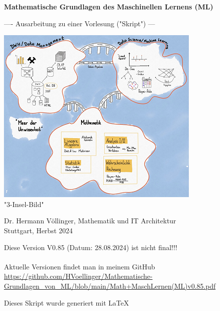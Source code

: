 \documentclass[12pt]{article}
\begin{document}

\begin{titlepage}
   \begin{center}
   \LARGE  
   \vspace{1.0cm}
       
   \textbf{Mathematische Grundlagen des Maschinellen Lernens (ML)}

   \vspace{1.0cm}
  
   \large       
   ---- Ausarbeitung zu einer Vorlesung ("Skript") ---
       
   
   \vspace{1.0cm}
   
   \includegraphics{DWH-Zeichnung}\\
   \small "3-Insel-Bild"  
       
   \vfill
   \large   
   
   Dr. Hermann Völlinger, Mathematik und IT Architektur
           \\ Stuttgart, Herbst 2024     

   \vspace{0.6cm}
        
   \end{center}
   
\begin{center}
Diese Version V0.85 (Datum: 28.08.2024) ist nicht final!!! \\
{\color{red}{(Beachte: ************ Kommentare *********)}} \\[0.3cm]
Aktuelle Versionen findet man in meinem GitHub\\[0.1cm]
\url{https://github.com/HVoellinger/Mathematische-Grundlagen_von_ML/blob/main/Math+MaschLernen(ML)v0.85.pdf} \\
\vspace{0.4cm}
\begin{large}
Dieses Skript wurde generiert mit \LaTeX\  
\end{large}
\end{center}


\end{titlepage}
\end{document}
